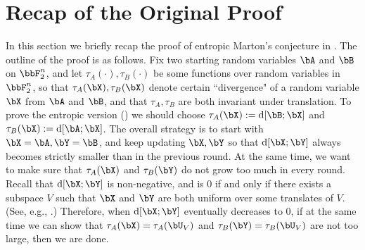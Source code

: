 \documentclass{article}
\DeclarePairedDelimiter{\sqpar}{[}{]}
\newcommand{\Ruz}{\mathrm{d}\sqpar}
\begin{document}
\section{Recap of the Original Proof}
In this section we briefly recap the proof of entropic Marton's conjecture in \cite{GGMT23}. The outline of the proof is as follows. Fix two starting random variables $\bA$ and $\bB$ on $\bbF_2^n$, and let $\tau_A(\cdot),\tau_B(\cdot)$ be some functions over random variables in $\bbF_2^n$, so that $\tau_A(\bX),\tau_B(\bX)$ denote certain ``divergence" of a random variable $\bX$ from $\bA$ and $\bB$, and that $\tau_A,\tau_B$ are both invariant under translation. To prove the entropic version () we should choose $\tau_A(\bX):=\Ruz{\bB;\bX}$ and $\tau_B(\bX):=\Ruz{\bA;\bX}$. The overall strategy is to start with $\bX=\bA,\bY=\bB$, and keep updating $\bX,\bY$ so that $\Ruz{\bX;\bY}$ always becomes strictly smaller than in the previous round. At the same time, we want to make sure that $\tau_A(\bX)$ and $\tau_B(\bY)$ do not grow too much in every round. Recall that $\Ruz{\bX;\bY}$ is non-negative, and is $0$ if and only if there exists a subspace $V$ such that $\bX$ and $\bY$ are both uniform over some translates of $V$. (See, e.g., \cite[Theorem 1.11]{Tao10}.) Therefore, when $\Ruz{\bX;\bY}$ eventually decreases to $0$, if at the same time we can show that $\tau_A(\bX)=\tau_A(\bU_V)$ and $\tau_B(\bY)=\tau_B(\bU_V)$ are not too large, then we are done. 
\end{document}
